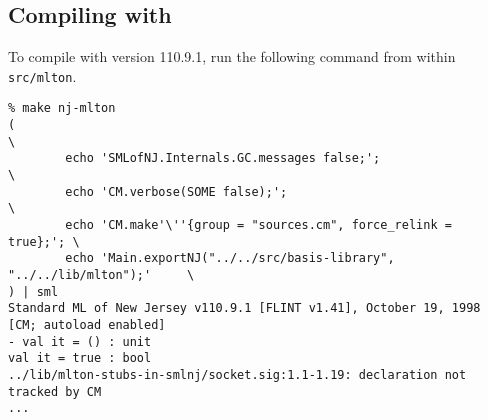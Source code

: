 \subsection{Compiling with {\smlnj}}

To compile with {\smlnj} version 110.9.1, run the following command from within
{\tt src/mlton}.
\begin{verbatim}
% make nj-mlton
(                                                                       \
        echo 'SMLofNJ.Internals.GC.messages false;';                    \
        echo 'CM.verbose(SOME false);';                                 \
        echo 'CM.make'\''{group = "sources.cm", force_relink = true};'; \
        echo 'Main.exportNJ("../../src/basis-library", "../../lib/mlton");'     \
) | sml
Standard ML of New Jersey v110.9.1 [FLINT v1.41], October 19, 1998 [CM; autoload enabled]
- val it = () : unit
val it = true : bool
../lib/mlton-stubs-in-smlnj/socket.sig:1.1-1.19: declaration not tracked by CM
...
\end{verbatim}
